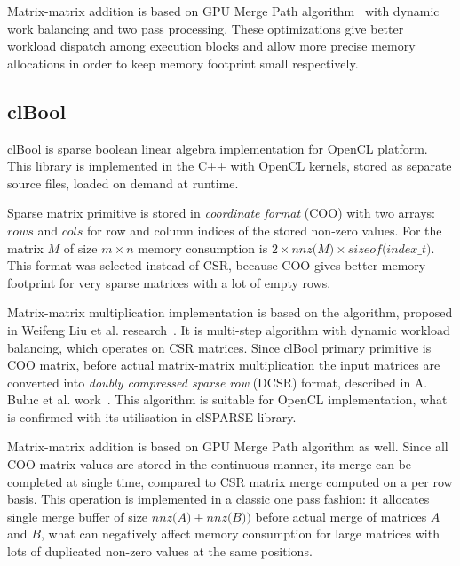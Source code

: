 Matrix-matrix addition is based on GPU Merge Path algorithm~\cite{inproceedings:gpu_merge_path} with dynamic work balancing and two pass processing. 
These optimizations give better workload dispatch among execution blocks and allow more precise memory allocations in
order to keep memory footprint small respectively. 


\subsection{clBool}

clBool is sparse boolean linear algebra implementation for OpenCL platform. This library is implemented 
in the C++ with OpenCL kernels, stored as separate source files, loaded on demand at runtime. 

Sparse matrix primitive is stored in \textit{coordinate format} (COO) with two arrays: $rows$ and $cols$ 
for row and column indices of the stored non-zero values. For the matrix $M$ of size $m \times n$ memory 
consumption is $2 \times \textit{nnz(M)} \times \textit{sizeof(index\_t)}$. This format was selected 
instead of CSR, because COO gives better memory footprint for very sparse matrices with a lot of empty rows.

Matrix-matrix multiplication implementation is based on the algorithm, proposed in Weifeng Liu et al. research~\cite{DBLP:journals/corr/0002V15a:spframework}. 
It is multi-step algorithm with dynamic workload balancing, which operates on CSR matrices. 
Since clBool primary primitive is COO matrix, before actual matrix-matrix multiplication the input matrices are converted into
\textit{doubly compressed sparse row} (DCSR) format, described in A. Buluc et al. work~\cite{4536313:about:dcsr}.
This algorithm is suitable for OpenCL implementation, what is confirmed with its utilisation in clSPARSE library.

Matrix-matrix addition is based on GPU Merge Path algorithm as well. Since all COO matrix values are stored in 
the continuous manner, its merge can be completed at single time, compared to CSR matrix merge computed on a 
per row basis. This operation is implemented in a classic one pass fashion: it allocates single merge 
buffer of size $\textit{nnz(A)} + \textit{nnz(B)})$ before actual merge of matrices $A$ and $B$, what can
negatively affect memory consumption for large matrices with lots of duplicated non-zero values at the 
same positions.
